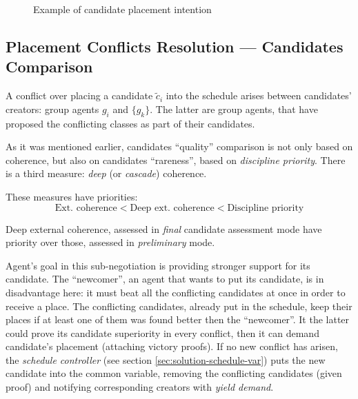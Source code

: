 \documentclass[../../ThesisDoc]{subfiles}
\begin{document}

\begin{figure}[H]
  \centering
  
  \caption{ Example of candidate placement intention }
  \label{fig:candidate-conflict}
\end{figure}


\subsection{Placement Conflicts Resolution --- Candidates Comparison}
\label{sec:solution-compare}

A conflict over placing a candidate $\tilde{c}_i$ into the schedule arises
between candidates' creators: group agents $g_i$ and $\{g_k\}$.
The latter are group agents, that have proposed the conflicting classes
as part of their candidates.

As it was mentioned earlier, candidates ``quality'' comparison is not only based
on coherence, but also on candidates ``rareness'', based on \emph{discipline priority}.
There is a third measure: \emph{deep} (or \emph{cascade}) coherence.

\medskip
\noindent
These measures have priorities:
$$ \text{Ext. coherence} < \text{Deep ext. coherence} < \text{Discipline priority} $$

\medskip
\noindent
Deep external coherence, assessed in \emph{final} candidate assessment mode
have priority over those, assessed in \emph{preliminary} mode.

\bigskip
\noindent
Agent's goal in this sub-negotiation is providing stronger support for its
candidate. The ``newcomer'', an agent that wants to put its candidate, is
in disadvantage here: it must beat all the conflicting candidates at once in
order to receive a place. The conflicting candidates, already put in the schedule,
keep their places if at least one of them was found better then the ``newcomer''.
It the latter could prove its candidate superiority in every conflict, then
it can demand candidate's placement (attaching victory proofs).
If no new conflict has arisen, the \emph{schedule controller}
(see section \ref{sec:solution-schedule-var}) puts the new candidate into the
common variable, removing the conflicting candidates (given proof) and notifying
corresponding creators with \emph{yield demand}.
\end{document}
